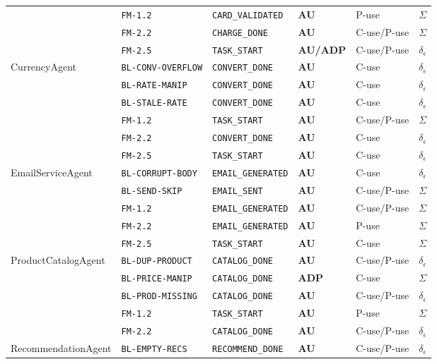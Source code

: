\begin{table}[t]
{\begin{tabular}{p{2.8cm}p{3.0cm}p{2.9cm}lll}
 & \texttt{FM-1.2} & \texttt{CARD\_VALIDATED} & \textbf{AU} & P-use & $\Sigma$ \\
 & \texttt{FM-2.2} & \texttt{CHARGE\_DONE} & \textbf{AU} & C-use/P-use & $\Sigma$ \\
 & \texttt{FM-2.5} & \texttt{TASK\_START} & \textbf{AU/ADP} & C-use/P-use & $\delta_{\epsilon}$ \\
\midrule
CurrencyAgent & \texttt{BL-CONV-OVERFLOW} & \texttt{CONVERT\_DONE} & \textbf{AU} & C-use & $\delta_{\epsilon}$ \\
 & \texttt{BL-RATE-MANIP} & \texttt{CONVERT\_DONE} & \textbf{AU} & C-use & $\delta_{\epsilon}$ \\
 & \texttt{BL-STALE-RATE} & \texttt{CONVERT\_DONE} & \textbf{AU} & C-use & $\delta_{\epsilon}$ \\
 & \texttt{FM-1.2} & \texttt{TASK\_START} & \textbf{AU} & C-use/P-use & $\Sigma$ \\
 & \texttt{FM-2.2} & \texttt{CONVERT\_DONE} & \textbf{AU} & C-use & $\delta_{\epsilon}$ \\
 & \texttt{FM-2.5} & \texttt{TASK\_START} & \textbf{AU} & C-use & $\delta_{\epsilon}$ \\
\midrule
EmailServiceAgent & \texttt{BL-CORRUPT-BODY} & \texttt{EMAIL\_GENERATED} & \textbf{AU} & C-use & $\delta_{\epsilon}$ \\
 & \texttt{BL-SEND-SKIP} & \texttt{EMAIL\_SENT} & \textbf{AU} & C-use/P-use & $\Sigma$ \\
 & \texttt{FM-1.2} & \texttt{EMAIL\_GENERATED} & \textbf{AU} & C-use/P-use & $\Sigma$ \\
 & \texttt{FM-2.2} & \texttt{EMAIL\_GENERATED} & \textbf{AU} & P-use & $\Sigma$ \\
 & \texttt{FM-2.5} & \texttt{TASK\_START} & \textbf{AU} & C-use & $\Sigma$ \\
\midrule
ProductCatalogAgent & \texttt{BL-DUP-PRODUCT} & \texttt{CATALOG\_DONE} & \textbf{AU} & C-use/P-use & $\delta_{\epsilon}$ \\
 & \texttt{BL-PRICE-MANIP} & \texttt{CATALOG\_DONE} & \textbf{ADP} & C-use & $\Sigma$ \\
 & \texttt{BL-PROD-MISSING} & \texttt{CATALOG\_DONE} & \textbf{AU} & C-use/P-use & $\delta_{\epsilon}$ \\
 & \texttt{FM-1.2} & \texttt{TASK\_START} & \textbf{AU} & P-use & $\Sigma$ \\
 & \texttt{FM-2.2} & \texttt{CATALOG\_DONE} & \textbf{AU} & C-use/P-use & $\delta_{\epsilon}$ \\
\midrule
RecommendationAgent & \texttt{BL-EMPTY-RECS} & \texttt{RECOMMEND\_DONE} & \textbf{AU} & C-use/P-use & $\delta_{\epsilon}$ \\

\end{tabular}}
\end{table}
